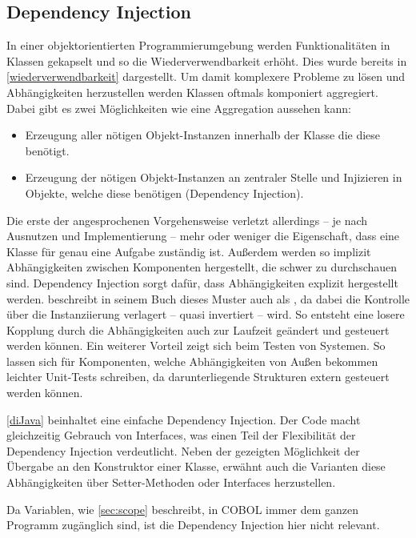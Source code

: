 \subsection{Dependency Injection}\label{depi}
In einer objektorientierten Programmierumgebung werden Funktionalitäten in Klassen gekapselt und so die Wiederverwendbarkeit erhöht. Dies wurde bereits in \autoref{wiederverwendbarkeit} dargestellt. Um damit komplexere Probleme zu lösen und Abhängigkeiten herzustellen werden Klassen oftmals komponiert \bzw aggregiert. Dabei gibt es zwei Möglichkeiten wie eine Aggregation aussehen kann:

\begin{itemize}
    \item Erzeugung aller nötigen Objekt-Instanzen innerhalb der Klasse die diese benötigt.
    \item Erzeugung der nötigen Objekt-Instanzen an zentraler Stelle und Injizieren in Objekte, welche diese benötigen (Dependency Injection). 
\end{itemize}

Die erste der angesprochenen Vorgehensweise verletzt allerdings -- je nach Ausnutzen und Implementierung -- mehr oder weniger die Eigenschaft, dass eine Klasse für genau eine Aufgabe zuständig ist. Außerdem werden so implizit Abhängigkeiten zwischen Komponenten hergestellt, die schwer zu durchschauen sind. Dependency Injection sorgt dafür, dass Abhängigkeiten explizit hergestellt werden. \citeauthor{martin_clean_2008} beschreibt in seinem Buch  dieses Muster auch als , da dabei die Kontrolle über die Instanziierung verlagert -- quasi invertiert -- wird. So entsteht eine losere Kopplung durch die Abhängigkeiten auch zur Laufzeit geändert und gesteuert werden können. Ein weiterer Vorteil zeigt sich beim Testen von Systemen. So lassen sich für Komponenten, welche Abhängigkeiten von Außen bekommen leichter Unit-Tests schreiben, da darunterliegende Strukturen extern gesteuert werden können.


\autoref{diJava} beinhaltet eine einfache Dependency Injection. Der Code macht gleichzeitig Gebrauch von Interfaces, was einen Teil der Flexibilität der Dependency Injection verdeutlicht. Neben der gezeigten Möglichkeit der Übergabe an den Konstruktor einer Klasse, erwähnt \citeauthor{martin_clean_2008} \cite{martin_clean_2008} auch die Varianten diese Abhängigkeiten über Setter-Methoden oder Interfaces herzustellen.

Da Variablen, wie \autoref{sec:scope} beschreibt, in COBOL immer dem ganzen Programm zugänglich sind, ist die Dependency Injection hier nicht relevant.